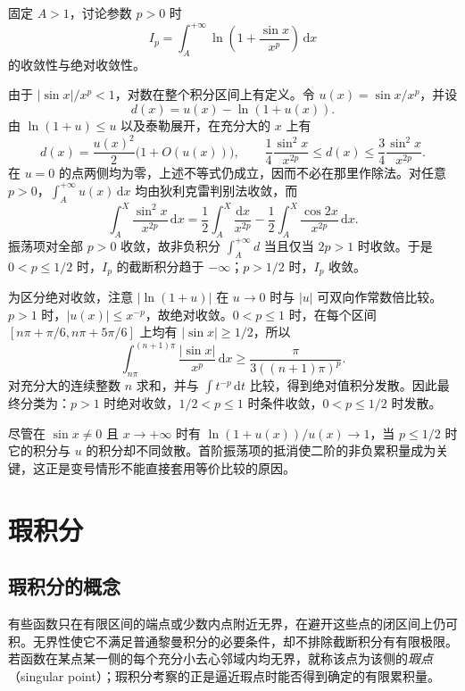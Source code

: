 \documentclass[UTF8,12pt,a4paper,fontset=fandol]{ctexbook}
\begin{document}
\begin{example}
\label{ex:oscillatory-log-improper-integral}
固定 $A>1$，讨论参数 $p>0$ 时
\[
    I_p=\int_A^{+\infty}\ln\left(1+\frac{\sin x}{x^p}\right)\,\mathrm{d}x
\]
的收敛性与绝对收敛性。
\end{example}

\begin{solve}
由于 $|\sin x|/x^p<1$，对数在整个积分区间上有定义。令 $u(x)=\sin x/x^p$，并设
\[
    d(x)=u(x)-\ln(1+u(x)).
\]
由 $\ln(1+u)\leq u$ 以及泰勒展开，在充分大的 $x$ 上有
\[
    d(x)=\frac{u(x)^2}{2}\bigl(1+O(u(x))\bigr),\qquad
    \frac14\frac{\sin^2x}{x^{2p}}
    \leq d(x)\leq\frac34\frac{\sin^2x}{x^{2p}}.
\]
在 $u=0$ 的点两侧均为零，上述不等式仍成立，因而不必在那里作除法。对任意 $p>0$，$\int_A^{+\infty}u(x)\,\mathrm{d}x$ 均由狄利克雷判别法收敛，而
\[
    \int_A^X\frac{\sin^2x}{x^{2p}}\,\mathrm{d}x
    =\frac12\int_A^X\frac{\mathrm{d}x}{x^{2p}}
     -\frac12\int_A^X\frac{\cos2x}{x^{2p}}\,\mathrm{d}x.
\]
振荡项对全部 $p>0$ 收敛，故非负积分 $\int_A^{+\infty}d$ 当且仅当 $2p>1$ 时收敛。于是 $0<p\leq1/2$ 时，$I_p$ 的截断积分趋于 $-\infty$；$p>1/2$ 时，$I_p$ 收敛。

为区分绝对收敛，注意 $|\ln(1+u)|$ 在 $u\to0$ 时与 $|u|$ 可双向作常数倍比较。$p>1$ 时，$|u(x)|\leq x^{-p}$，故绝对收敛。$0<p\leq1$ 时，在每个区间 $[n\pi+\pi/6,n\pi+5\pi/6]$ 上均有 $|\sin x|\geq1/2$，所以
\[
    \int_{n\pi}^{(n+1)\pi}\frac{|\sin x|}{x^p}\,\mathrm{d}x
    \geq\frac{\pi}{3((n+1)\pi)^p}.
\]
对充分大的连续整数 $n$ 求和，并与 $\int t^{-p}\,\mathrm{d}t$ 比较，得到绝对值积分发散。因此最终分类为：$p>1$ 时绝对收敛，$1/2<p\leq1$ 时条件收敛，$0<p\leq1/2$ 时发散。

尽管在 $\sin x\neq0$ 且 $x\to+\infty$ 时有 $\ln(1+u(x))/u(x)\to1$，当 $p\leq1/2$ 时它的积分与 $u$ 的积分却不同敛散。首阶振荡项的抵消使二阶的非负累积量成为关键，这正是变号情形不能直接套用等价比较的原因。
\end{solve}

\section{瑕积分}
\label{sec:singular-integrals}

\subsection{瑕积分的概念}
\label{subsec:concept-of-singular-integrals}

有些函数只在有限区间的端点或少数内点附近无界，在避开这些点的闭区间上仍可积。无界性使它不满足普通黎曼积分的必要条件，却不排除截断积分有有限极限。若函数在某点某一侧的每个充分小去心邻域内均无界，就称该点为该侧的\emph{瑕点}（singular point）；瑕积分考察的正是逼近瑕点时能否得到确定的有限累积量。
\end{document}
